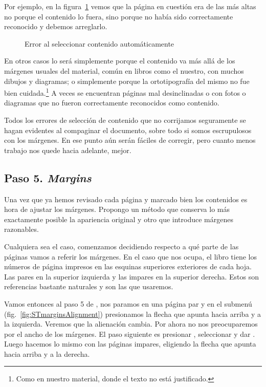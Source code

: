 \documentclass[%
	a5paper,
	10pt,
	twoside,
	openright,
	final,
]{memoir}
\begin{document}
	Por ejemplo, en la figura~\ref{fig:STselectContentError} vemos que la página en cuestión era de las más altas no porque el contenido lo fuera, sino porque no había sido correctamente reconocido y debemos arreglarlo.

	\begin{figure}
		\centering
		\caption{Error al seleccionar contenido automáticamente\label{fig:STselectContentError}}
	\end{figure}

	En otros casos lo será simplemente porque el contenido va más allá de los márgenes usuales del material, común en libros como el nuestro, con muchos dibujos y diagramas; o simplemente porque la ortotipografía del mismo no fue bien cuidada.\footnote{Como en nuestro material, donde el texto no está justificado.} A veces se encuentran páginas mal desinclinadas o con fotos o diagramas que no fueron correctamente reconocidos como contenido.

	Todos los errores de selección de contenido que no corrijamos seguramente se hagan evidentes al compaginar el documento, sobre todo si somos escrupulosos con los márgenes. En ese punto aún serán fáciles de corregir, pero cuanto menos trabajo nos quede hacia adelante, mejor.

	\subsection{Paso 5. \emph{Margins}\label{sec:STmargins}} Una vez que ya hemos revisado cada página y marcado bien los contenidos es hora de ajustar los márgenes. Propongo un método que conserva lo más exactamente posible la apariencia original y otro que introduce márgenes razonables.

	Cualquiera sea el caso, comenzamos decidiendo respecto a qué parte de las páginas vamos a referir los márgenes. En el caso que nos ocupa, el libro tiene los números de página impresos en las esquinas superiores exteriores de cada hoja. Las pares en la superior izquierda y las impares en la superior derecha. Estos son referencias bastante naturales y son las que usaremos.

	Vamos entonces al paso 5 de \scantailor, nos paramos en una página par y en el submenú  (fig.~\ref{fig:STmarginsAlignment}) presionamos la flecha que apunta hacia arriba y a la izquierda. Veremos que la alienación cambia. Por ahora no nos preocuparemos por el ancho de los márgenes. El paso siguiente es presionar , seleccionar  y dar . Luego hacemos lo mismo con las páginas impares, eligiendo la flecha que apunta hacia arriba y a la derecha.
\end{document}
